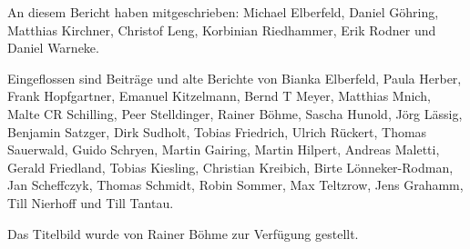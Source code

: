 \documentclass[a4paper]{scrreprt}
\begin{document}
\vfill

An diesem Bericht haben mitgeschrieben: Michael Elberfeld, Daniel Göhring, Matthias Kirchner, Christof Leng, Korbinian Riedhammer, Erik Rodner und  Daniel Warneke. 

Eingeflossen sind Beiträge und alte Berichte von Bianka Elberfeld,
Paula Herber, Frank Hopfgartner, Emanuel Kitzelmann, Bernd T Meyer,
Matthias Mnich, Malte CR Schilling, Peer Stelldinger, Rainer Böhme,
Sascha Hunold, Jörg Lässig, Benjamin Satzger, Dirk Sudholt, Tobias
Friedrich, Ulrich Rückert, Thomas Sauerwald, Guido Schryen, Martin
Gairing, Martin Hilpert, Andreas Maletti, Gerald Friedland, Tobias
Kiesling, Christian Kreibich, Birte Lönneker-Rodman, Jan Scheffczyk,
Thomas Schmidt, Robin Sommer, Max Teltzrow, Jens Grahamm, Till
Nierhoff und Till Tantau.

Das Titelbild wurde von Rainer Böhme zur Verfügung gestellt.
\end{document}
